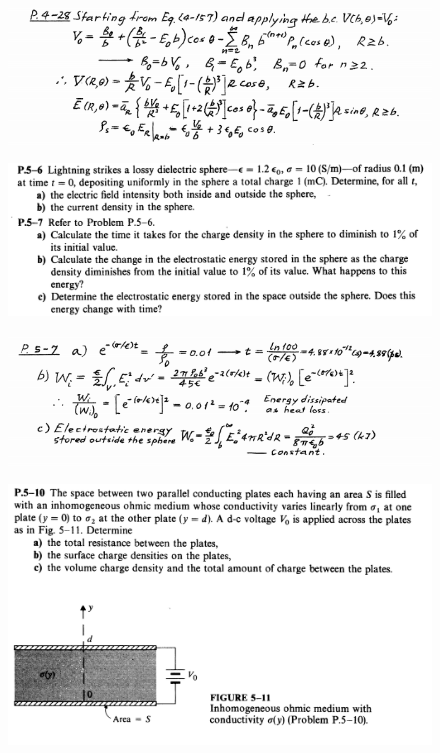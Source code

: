 \documentclass[xcolor={dvipsnames}]{beamer}
\begin{document}
\begin{frame}
\begin{figure}[H]
	\centering
	\includegraphics[width=0.9\linewidth]{5_2.png}
\end{figure}
\end{frame}
\begin{frame}
\begin{figure}[H]
	\centering
	\includegraphics[width=0.9\linewidth]{5_7.png}
\end{figure}
\pause
\begin{figure}[H]
	\centering
	\includegraphics[width=0.9\linewidth]{5_8.png}
\end{figure}
\end{frame}
\begin{frame}
\begin{figure}[H]
	\centering
	\includegraphics[width=0.9\linewidth]{5_9.png}
\end{figure}

\end{frame}
\end{document}

